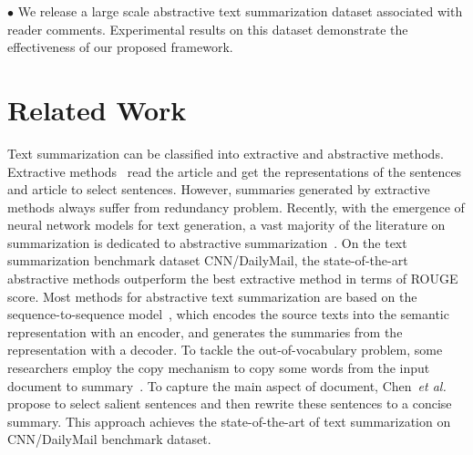 \documentclass[letterpaper]{article} %
\newcommand{\etal}{\emph{et al.}\xspace}
\begin{document}
$\bullet$ We release a large scale abstractive text summarization dataset associated with reader comments.
Experimental results on this dataset demonstrate the effectiveness of our proposed framework.
    
\section{Related Work}
Text summarization can be classified into extractive and abstractive methods. 
Extractive methods~\cite{Jadhav2018ExtractiveSW,Narayan2018RankingSF} read the article and get the representations of the sentences and article to select sentences.
However, summaries generated by extractive methods always suffer from redundancy problem.
Recently, with the emergence of neural network models for text generation, a vast majority of the literature on summarization is dedicated to abstractive summarization~\cite{Bansal2018FastAS,Ma2018AutoencoderAA,Zhou2018SequentialCN}.
On the text summarization benchmark dataset CNN/DailyMail, the state-of-the-art abstractive methods outperform the best extractive method in terms of ROUGE score.
Most methods for abstractive text summarization are based on the sequence-to-sequence model~\cite{Sutskever2014SequenceTS}, which encodes the source texts into the semantic representation with an encoder, and generates the summaries from the representation with a decoder.
To tackle the out-of-vocabulary problem, some researchers employ the copy mechanism to copy some words from the input document to summary~\cite{Gu2016IncorporatingCM,see2017get}.
To capture the main aspect of document, Chen~\etal~ propose to select salient sentences and then rewrite these sentences to a concise summary.
This approach achieves the state-of-the-art of text summarization on CNN/DailyMail benchmark dataset.
\end{document}
